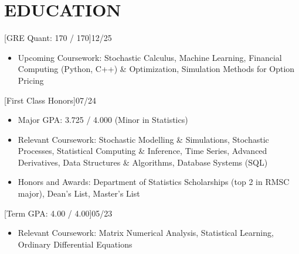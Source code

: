 \documentclass[cmu]{resume}
\begin{document}
    \address{160 Water Street, New York, NY 10038}
    \maketitle
    \section{EDUCATION}
    [GRE Quant: 170 / 170]{12/25}
    \begin{itemize}
        \item Upcoming Coursework: Stochastic Calculus, Machine Learning, Financial Computing (Python, C++) \& Optimization, Simulation Methods for Option Pricing
    \end{itemize}

    [First Class Honors]{07/24}
    \begin{itemize}
        \item Major GPA: 3.725 / 4.000 (Minor in Statistics)
        \item Relevant Coursework: Stochastic Modelling \& Simulations, Stochastic Processes, Statistical Computing \& Inference, Time Series, Advanced Derivatives, Data Structures \& Algorithms, Database Systems (SQL)
        \item Honors and Awards: Department of Statistics Scholarships (top 2 in RMSC major), Dean's List, Master's List
    \end{itemize}

    [Term GPA: 4.00 / 4.00]{05/23}
    \begin{itemize}
        \item Relevant Coursework: Matrix Numerical Analysis, Statistical Learning, Ordinary Differential Equations
    \end{itemize}
\end{document}
